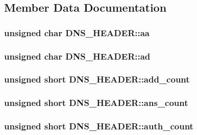 \subsection{Member Data Documentation}
\hypertarget{struct_d_n_s___h_e_a_d_e_r_a0b35c4f2cf9cc0d1555afa24676c2b26}{
\subsubsection[{aa}]{\setlength{\rightskip}{0pt plus 5cm}unsigned char D\-N\-S\-\_\-\-H\-E\-A\-D\-E\-R\-::aa}}\label{struct_d_n_s___h_e_a_d_e_r_a0b35c4f2cf9cc0d1555afa24676c2b26}
\hypertarget{struct_d_n_s___h_e_a_d_e_r_a61bfa8d857d74fb70872b179ddbe59e5}{
\subsubsection[{ad}]{\setlength{\rightskip}{0pt plus 5cm}unsigned char D\-N\-S\-\_\-\-H\-E\-A\-D\-E\-R\-::ad}}\label{struct_d_n_s___h_e_a_d_e_r_a61bfa8d857d74fb70872b179ddbe59e5}
\hypertarget{struct_d_n_s___h_e_a_d_e_r_a62902698d81157eba889e57f56b11702}{
\subsubsection[{add\-\_\-count}]{\setlength{\rightskip}{0pt plus 5cm}unsigned short D\-N\-S\-\_\-\-H\-E\-A\-D\-E\-R\-::add\-\_\-count}}\label{struct_d_n_s___h_e_a_d_e_r_a62902698d81157eba889e57f56b11702}
\hypertarget{struct_d_n_s___h_e_a_d_e_r_abf109ef7bbba2e8145177411c6835faa}{
\subsubsection[{ans\-\_\-count}]{\setlength{\rightskip}{0pt plus 5cm}unsigned short D\-N\-S\-\_\-\-H\-E\-A\-D\-E\-R\-::ans\-\_\-count}}\label{struct_d_n_s___h_e_a_d_e_r_abf109ef7bbba2e8145177411c6835faa}
\hypertarget{struct_d_n_s___h_e_a_d_e_r_aa8c1b1d176c5ff1ab2007af10cecccf7}{
\subsubsection[{auth\-\_\-count}]{\setlength{\rightskip}{0pt plus 5cm}unsigned short D\-N\-S\-\_\-\-H\-E\-A\-D\-E\-R\-::auth\-\_\-count}}\label{struct_d_n_s___h_e_a_d_e_r_aa8c1b1d176c5ff1ab2007af10cecccf7}
